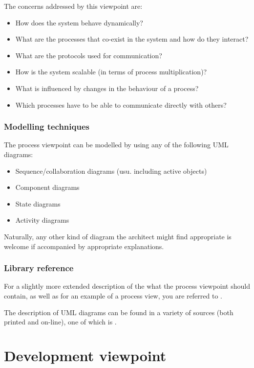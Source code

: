 The concerns addressed by this viewpoint are:

\begin{itemize}
\item How does the system behave dynamically?
\item What are the processes that co-exist in the system and how do they interact?
\item What are the protocols used for communication?
\item How is the system scalable (in terms of process multiplication)?
\item What is influenced by changes in the behaviour of a process?
\item Which processes have to be able to communicate directly with others?
\end{itemize}

\subsubsection{Modelling techniques}

The process viewpoint can be modelled by using any of the following UML diagrams:

\begin{itemize}
\item Sequence/collaboration diagrams (usu. including active objects)
\item Component diagrams
\item State diagrams
\item Activity diagrams
\end{itemize}

Naturally, any other kind of diagram the architect might find appropriate is welcome
if accompanied by appropriate explanations.

\subsubsection{Library reference}

For a slightly more extended description of the what the process viewpoint should contain,
as well as for an example of a process view, you are referred to \cite{kru95}.

The description of UML diagrams can be found in a variety of sources (both printed and
on-line), one of which is \cite{fow00}.

\section{Development viewpoint}

